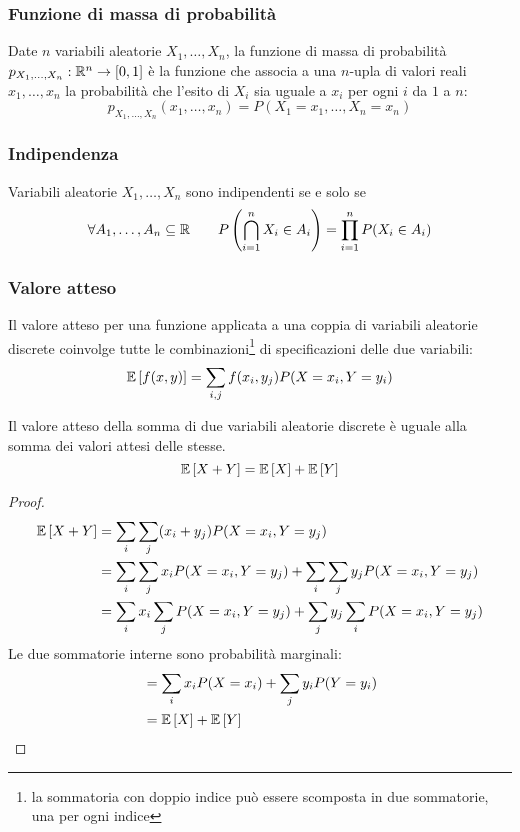\subsubsection{Funzione di massa di probabilità}
\begin{defin}
	Date $n$ variabili aleatorie $X_1, \dots, X_n$, la funzione di massa di probabilità $p_{X_1,\dots,X_n}:\mathbb R^n\to[0,1]$ è la funzione che associa a una $n$-upla di valori reali $x_1,\dots,x_n$ la probabilità che l'esito di $X_i$ sia uguale a $x_i$ per ogni $i$ da $1$ a $n$:
	\begin{equation*}
		p_{X_1,\dots,X_n}(x_1,\dots,x_n) = P(X_1=x_1,\dots,X_n=x_n)
	\end{equation*}
\end{defin}


\subsubsection{Indipendenza}
\begin{defin}
	Variabili aleatorie $X_1,\dots,X_n$ sono indipendenti se e solo se
	\begin{equation*}
		\forall A_1,\dots,A_n\subseteq\mathbb R \qquad P\left(\bigcap_{i=1}^n X_i\in A_i\right) = \prod_{i=1}^n P(X_i\in A_i)
	\end{equation*}
\end{defin}


\subsubsection{Valore atteso}
Il valore atteso per una funzione applicata a una coppia di variabili aleatorie discrete coinvolge tutte le combinazioni\footnote{la sommatoria con doppio indice può essere scomposta in due sommatorie, una per ogni indice} di specificazioni delle due variabili:
\begin{equation*}
	\mathbb{E}\left[ f(x,y) \right]=\sum_{i,j}f(x_i,y_j)P(X=x_i,Y=y_i)
\end{equation*}

\begin{prop}
	Il valore atteso della somma di due variabili aleatorie discrete è uguale alla somma dei valori attesi delle stesse.
	\begin{equation*}
		\mathbb{E}\left[ X+Y \right]=\mathbb{E}\left[ X \right]+\mathbb{E}\left[ Y \right]
	\end{equation*}
\end{prop}
\begin{proof}
	\begin{align*}
		\mathbb{E}\left[ X+Y \right] & = \sum_i\sum_j (x_i+y_j) P(X=x_i,Y=y_j)                               \\
		         & = \sum_i\sum_j x_i P(X=x_i,Y=y_j) + \sum_i\sum_j y_j P(X=x_i,Y=y_j)   \\
		         & = \sum_i x_i \sum_j P(X=x_i,Y=y_j) + \sum_j y_j \sum_i P(X=x_i,Y=y_j)
	\end{align*}
	Le due sommatorie interne sono probabilità marginali:
	\begin{align*}
		 & = \sum_i x_i P(X=x_i) + \sum_j y_i P(Y=y_i) \\
		 & = \mathbb{E}\left[ X \right] + \mathbb{E}\left[ Y \right]
	\end{align*}
\end{proof}

